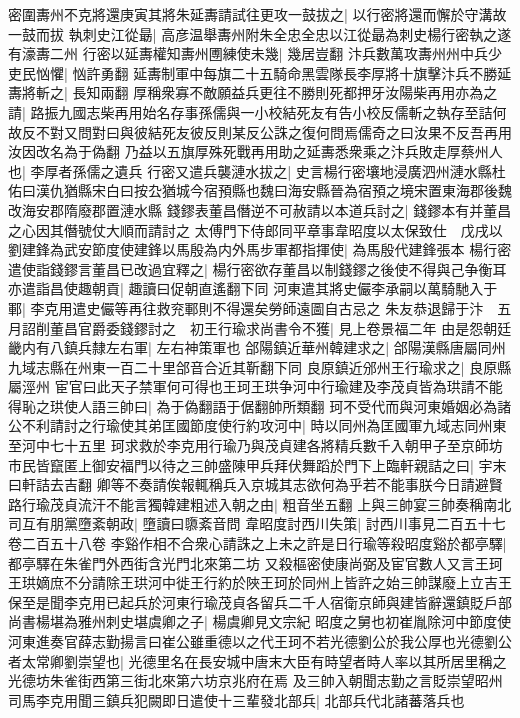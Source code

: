 密圍夀州不克將還庚寅其將朱延夀請試往更攻一鼓拔之|{
	以行密將還而懈於守溝故一鼓而拔}
執刺史江從朂|{
	高彦温舉夀州附朱全忠全忠以江從朂為刺史楊行密執之遂有濠夀二州}
行密以延夀權知夀州圑練使未幾|{
	幾居豈翻}
汴兵數萬攻夀州州中兵少吏民忷懼|{
	忷許勇翻}
延夀制軍中每旗二十五騎命黑雲隊長李厚將十旗擊汴兵不勝延夀將斬之|{
	長知兩翻}
厚稱衆寡不敵願益兵更往不勝則死都押牙汝陽柴再用亦為之請|{
	路振九國志柴再用始名存事孫儒與一小校結死友有告小校反儒斬之執存至詰何故反不對又問對曰與彼結死友彼反則某反公誅之復何問焉儒奇之曰汝果不反吾再用汝因改名為于偽翻}
乃益以五旗厚殊死戰再用助之延夀悉衆乘之汴兵敗走厚蔡州人也|{
	李厚者孫儒之遺兵}
行密又遣兵襲漣水拔之|{
	史言楊行密壤地浸廣泗州漣水縣杜佑曰漢仇猶縣宋白曰按厹猶城今宿預縣也魏曰海安縣晉為宿預之境宋置東海郡後魏改海安郡隋廢郡置漣水縣}
錢鏐表董昌僭逆不可赦請以本道兵討之|{
	錢鏐本有并董昌之心因其僭號仗大順而請討之}
太傅門下侍郎同平章事韋昭度以太保致仕　戊戌以劉建鋒為武安節度使建鋒以馬殷為内外馬步軍都指揮使|{
	為馬殷代建鋒張本}
楊行密遣使詣錢鏐言董昌已改過宜釋之|{
	楊行密欲存董昌以制錢鏐之後使不得與己争衡耳}
亦遣詣昌使趣朝貢|{
	趣讀曰促朝直遙翻下同}
河東遣其將史儼李承嗣以萬騎馳入于鄆|{
	李克用遣史儼等再往救兖鄆則不得還矣勞師遠圖自古忌之}
朱友恭退歸于汴　五月詔削董昌官爵委錢鏐討之　初王行瑜求尚書令不獲|{
	見上卷景福二年}
由是怨朝廷畿内有八鎮兵隸左右軍|{
	左右神策軍也}
郃陽鎮近華州韓建求之|{
	郃陽漢縣唐屬同州九域志縣在州東一百二十里郃音合近其靳翻下同}
良原鎮近邠州王行瑜求之|{
	良原縣屬涇州}
宦官曰此天子禁軍何可得也王珂王珙争河中行瑜建及李茂貞皆為珙請不能得恥之珙使人語三帥曰|{
	為于偽翻語于倨翻帥所類翻}
珂不受代而與河東婚姻必為諸公不利請討之行瑜使其弟匡國節度使行約攻河中|{
	時以同州為匡國軍九域志同州東至河中七十五里}
珂求救於李克用行瑜乃與茂貞建各將精兵數千入朝甲子至京師坊市民皆竄匿上御安福門以待之三帥盛陳甲兵拜伏舞蹈於門下上臨軒親詰之曰|{
	宇末曰軒詰去吉翻}
卿等不奏請俟報輒稱兵入京城其志欲何為乎若不能事朕今日請避賢路行瑜茂貞流汗不能言獨韓建粗述入朝之由|{
	粗音坐五翻}
上與三帥宴三帥奏稱南北司互有朋黨墮紊朝政|{
	墮讀曰隳紊音問}
韋昭度討西川失策|{
	討西川事見二百五十七卷二百五十八卷}
李谿作相不合衆心請誅之上未之許是日行瑜等殺昭度谿於都亭驛|{
	都亭驛在朱雀門外西街含光門北來第二坊}
又殺樞密使康尚弼及宦官數人又言王珂王珙嫡庶不分請除王珙河中徙王行約於陜王珂於同州上皆許之始三帥謀廢上立吉王保至是聞李克用已起兵於河東行瑜茂貞各留兵二千人宿衛京師與建皆辭還鎮貶戶部尚書楊堪為雅州刺史堪虞卿之子|{
	楊虞卿見文宗紀}
昭度之舅也初崔胤除河中節度使河東進奏官薛志勤揚言曰崔公雖重德以之代王珂不若光德劉公於我公厚也光德劉公者太常卿劉崇望也|{
	光德里名在長安城中唐末大臣有時望者時人率以其所居里稱之光德坊朱雀街西第三街北來第六坊京兆府在焉}
及三帥入朝聞志勤之言貶崇望昭州司馬李克用聞三鎮兵犯闕即日遣使十三輩發北部兵|{
	北部兵代北諸蕃落兵也}

